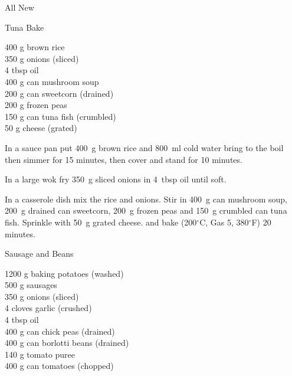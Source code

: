 \begin{menu}{All New}
    \begin{recipe}{2}{Tuna Bake}%
    
		\begin{ingredients}
		400 g brown rice  \\
	350 g onions (sliced) \\
	4 tbsp oil  \\
	400 g can mushroom soup  \\
	200 g can sweetcorn (drained) \\
	200 g frozen peas  \\
	150 g can tuna fish (crumbled) \\
	50 g cheese (grated) \\
	
		\end{ingredients}
	
    \begin{instructions}
    \item 
      In a
      sauce pan
      put
      400~g  brown rice
      and
      800~ml  cold water
      bring to the boil then simmer for 15 minutes,
      then cover and stand for 10 minutes.
    \item 
        In a large wok fry
        350~g sliced onions
        in
        4~tbsp  oil
        until soft.
      \item 
        In a casserole dish mix
        the rice and onions.
        Stir in
        400~g  can mushroom soup,
        200~g drained can sweetcorn,
        200~g  frozen peas
        and
        150~g crumbled can tuna fish.
        Sprinkle with
        50~g grated cheese.
        and
        bake 
      (200$^{\circ}$C, Gas 5, 380$^{\circ}$F)
     20 minutes.
      
    \end{instructions}
    \end{recipe}%
  
    \begin{recipe}{2}{Sausage and Beans}%
    
		\begin{ingredients}
		1200 g baking potatoes (washed) \\
	500 g sausages  \\
	350 g onions (sliced) \\
	4 cloves garlic (crushed) \\
	4 tbsp oil  \\
	400 g can chick peas (drained) \\
	400 g can borlotti beans (drained) \\
	140 g tomato puree  \\
	400 g can tomatoes (chopped) \\
	

\end{ingredients}
\end{recipe}
\end{menu}
